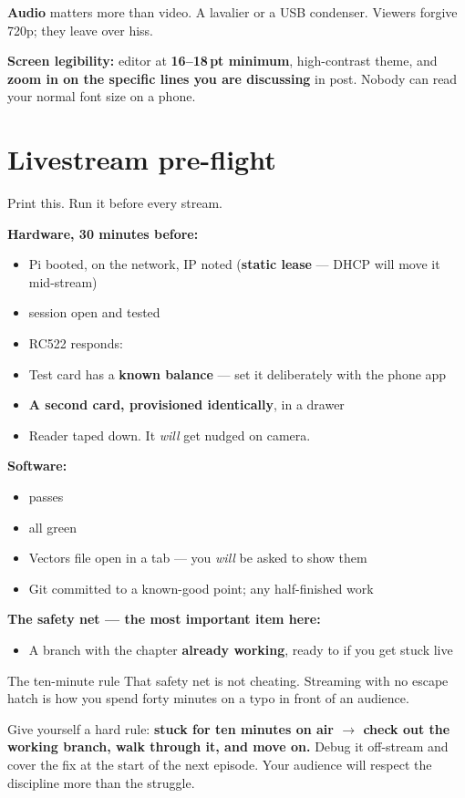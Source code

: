 \textbf{Audio} matters more than video. A lavalier or a USB condenser. Viewers
forgive 720p; they leave over hiss.

\textbf{Screen legibility:} editor at \textbf{16--18\,pt minimum}, high-contrast
theme, and \textbf{zoom in on the specific lines you are discussing} in post.
Nobody can read your normal font size on a phone.

\section{Livestream pre-flight}

Print this. Run it before every stream.

\textbf{Hardware, 30 minutes before:}
\begin{itemize}[label=$\square$]
  \item Pi booted, on the network, IP noted (\textbf{static lease} --- DHCP will
        move it mid-stream)
  \item {} session open and tested
  \item RC522 responds: 
  \item Test card has a \textbf{known balance} --- set it deliberately with the
        phone app
  \item \textbf{A second card, provisioned identically}, in a drawer
  \item Reader taped down. It \emph{will} get nudged on camera.
\end{itemize}

\textbf{Software:}
\begin{itemize}[label=$\square$]
  \item {} passes
  \item {} all green
  \item Vectors file open in a tab --- you \emph{will} be asked to show them
  \item Git committed to a known-good point;  any half-finished work
\end{itemize}

\textbf{The safety net --- the most important item here:}
\begin{itemize}[label=$\square$]
  \item A branch with the chapter \textbf{already working}, ready to
         if you get stuck live
\end{itemize}

\begin{concept}{The ten-minute rule}
That safety net is not cheating. Streaming with no escape hatch is how you spend
forty minutes on a typo in front of an audience.

Give yourself a hard rule: \textbf{stuck for ten minutes on air $\rightarrow$
check out the working branch, walk through it, and move on.} Debug it off-stream
and cover the fix at the start of the next episode. Your audience will respect
the discipline more than the struggle.
\end{concept}

